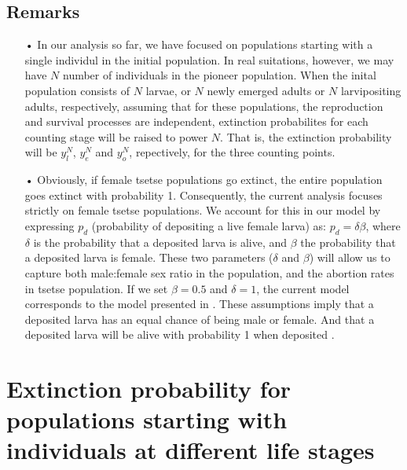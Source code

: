 \documentclass[smallextended]{svjour3}
\newcommand{\comment}[3]{\textcolor{#1}{\textbf{[#2: }\textit{#3}\textbf{]}}}
\newcommand{\jd}[1]{\comment{cyan}{JD}{#1}}
\newcommand{\eb}[1]{\comment{blue}{EB}{#1}}
\begin{document}
\subsection*{\bf Remarks}
\begin{itemize}
	\item[•] In our analysis so far, we have focused on populations starting with a single individul in the initial population. In real suitations, however, we may have $N$ number of individuals in the pioneer population. When the inital population consists of $N$ larvae, or $N$ newly emerged adults or $N$ larvipositing adults, respectively, assuming that for these populations, the reproduction and survival processes are independent, extinction probabilites for each counting stage will be raised to power $N$. That is, the extinction probability will be $y_l^N$, $y_e^N$ and $y_o^N$, repectively, for the three counting points.  
\item[•] Obviously, if  female tsetse populations go extinct, the entire population goes extinct with probability 1. Consequently, the current analysis focuses strictly on female tsetse populations. We account for this  in our model by expressing  $p_d$ (probability of depositing a live female larva) as:  $p_d =\delta \beta$, where $\delta$ is the probability that a deposited larva is alive, and $\beta$ the probability that a deposited larva is female.  These two parameters ($\delta$ and $\beta$) will allow us to capture both male:female sex ratio in the population, and  the abortion rates in tsetse population.  If we set $\beta = 0.5$ and $\delta = 1$, the current model corresponds to the model presented in \cite{Hargrove2005a}. These assumptions  imply that a deposited larva has an equal chance of being male or female.  And that a deposited larva will be alive with probability 1 when deposited  .   
\end{itemize}
\section{Extinction probability for  populations starting with individuals at different life stages}

\end{document}
